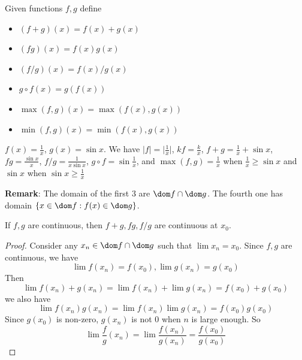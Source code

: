 \documentclass{report}
\begin{document}
Given functions $f, g$ define 
\begin{itemize}
    \item  $(f + g)(x) = f(x) + g(x)$

    \item  $(fg)(x) = f(x)g(x)$

    \item $(f/g)(x) = f(x)/g(x)$

    \item $g \circ f(x) = g(f(x))$

    \item $\max(f, g)(x) = \max(f(x), g(x))$

    \item $\min(f, g)(x) = \min(f(x), g(x))$
\end{itemize}

\begin{examples}
    \begin{example}
        $f(x) = \frac{1}{x}$, $g(x) = \sin{x}$. We have $\lvert f \rvert = \lvert \frac{1}{x} \rvert$, $kf = \frac{k}{x}$, $f + g = \frac{1}{x} + \sin{x}$, $fg = \frac{\sin{x}}{x}$, $f/g = \frac{1}{x \sin{x}}$, $g \circ f = \sin{\frac{1}{x}}$, and $\max(f, g) = \frac{1}{x}$ when $\frac{1}{x} \geq \sin{x}$ and $\sin{x}$ when $\sin{x} \geq \frac{1}{x}$
    \end{example} 
\end{examples}

\textbf{Remark}: The domain of the first $3$ are $\dom f \cap  \dom g$. The fourth one has domain $\{x \in \dom f : f(x) \in \dom g\}$.

\begin{theorem}{17.4}
    If $f, g$ are continuous, then $f + g, fg, f/g$ are continuous at $x_{0}$.
\end{theorem}
    \begin{proof}
        Consider any $x_{n} \in \dom f \cap \dom g$ such that $\lim x_{n} = x_{0}$. Since $f, g$ are continuous, we have 
            \begin{equation*}
                \lim f(x_{n}) = f(x_{0}), \lim g(x_{n}) = g(x_{0})
            \end{equation*}
        Then 
            \begin{equation*}
                \lim f(x_{n}) + g(x_{n}) = \lim f(x_{n}) + \lim g(x_{n}) = f(x_{0}) + g(x_{0})
            \end{equation*}
        we also have
            \begin{equation*}
                \lim f(x_{n})g(x_{n}) = \lim f(x_{n})\lim g(x_{n}) = f(x_{0})g(x_{0})
            \end{equation*}
        Since $g(x_{0})$ is non-zero, $g(x_{n})$ is not 0 when $n$ is large enough. So
            \begin{equation*}
                \lim \dfrac{f}{g}(x_{n}) = \lim \dfrac{f(x_{n})}{g(x_{n})} = \dfrac{f(x_{0})}{g(x_{0})}
            \end{equation*}
    \end{proof}
\end{document}
